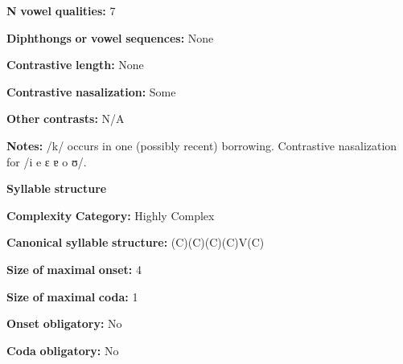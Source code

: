 \begin{styleBody}
\textbf{N} \textbf{vowel} \textbf{qualities:} 7
\end{styleBody}

\begin{styleBody}
\textbf{Diphthongs} \textbf{or} \textbf{vowel} \textbf{sequences:} None
\end{styleBody}

\begin{styleBody}
\textbf{Contrastive} \textbf{length:} None
\end{styleBody}

\begin{styleBody}
\textbf{Contrastive} \textbf{nasalization:} Some
\end{styleBody}

\begin{styleBody}
\textbf{Other} \textbf{contrasts:} N/A
\end{styleBody}

\begin{styleBody}
\textbf{Notes:} /k/ occurs in one (possibly recent) borrowing. Contrastive nasalization for /i e ɛ ɐ o ʊ/.
\end{styleBody}

\begin{styleBody}
\textbf{Syllable} \textbf{structure}
\end{styleBody}

\begin{styleBody}
\textbf{Complexity} \textbf{Category:} Highly Complex
\end{styleBody}

\begin{styleBody}
\textbf{Canonical} \textbf{syllable} \textbf{structure:} (C)(C)(C)(C)V(C) \citep[68-76]{Marmion2010}
\end{styleBody}

\begin{styleBody}
\textbf{Size} \textbf{of} \textbf{maximal} \textbf{onset:} 4
\end{styleBody}

\begin{styleBody}
\textbf{Size} \textbf{of} \textbf{maximal} \textbf{coda:} 1
\end{styleBody}

\begin{styleBody}
\textbf{Onset} \textbf{obligatory:} No
\end{styleBody}

\begin{styleBody}
\textbf{Coda} \textbf{obligatory:} No
\end{styleBody}

